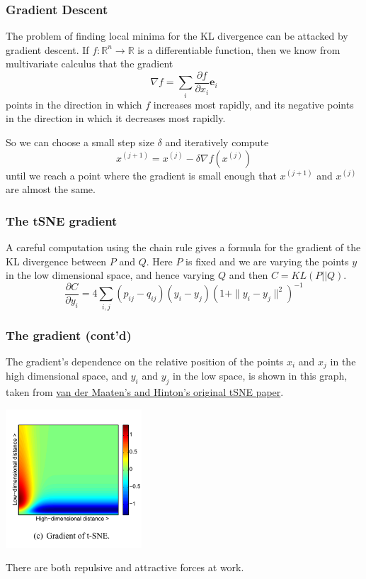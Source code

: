 \documentclass{beamer}
\begin{document}
\begin{frame}
  \frametitle{Gradient Descent}
  The problem of finding local minima for the KL divergence can be attacked by gradient descent. If $f:\mathbb{R}^{n}\to\mathbb{R}$
  is a differentiable function, then we know from multivariate calculus that the gradient
  $$
  \nabla f = \sum_{i}\frac{\partial f}{\partial x_i}\mathbf{e}_{i}
  $$
  points in the direction in which $f$ increases most rapidly, and its negative points in the direction in which it decreases most rapidly.
  \bigskip\noindent

  So we can choose a small step size $\delta$ and iteratively compute
  $$
  x^{(j+1)}=x^{(j)}-\delta\nabla f(x^{(j)})
  $$
  until we reach a point where the gradient is small enough that $x^{(j+1)}$  and $x^{(j)}$ are almost the same.
\end{frame}
\begin{frame}
  \frametitle{The tSNE gradient}
  A careful computation using the chain rule gives a formula for the gradient of the KL divergence between $P$ and $Q$. Here $P$ is fixed and we are varying
  the points $y$ in the low dimensional space, and hence varying $Q$ and then $C=KL(P||Q)$.
  $$
  \frac{\partial C}{\partial y_i} =
  4\sum_{i,j} (p_{ij}-q_{ij}) (y_i-y_j) (1+\|y_i-y_j\|^2)^{-1}
  $$
\end{frame}
\begin{frame}
\frametitle{The gradient (cont'd)}

  The gradient's dependence on the relative position of the points $x_i$ and $x_j$ in the high dimensional space, and $y_i$ and $y_j$ in the low space,
  is shown in this graph, taken from \href{https://lvdmaaten.github.io/publications/papers/JMLR\_2008.pdf}{van der Maaten's and Hinton's original tSNE paper}.
\begin{center}
  \includegraphics[width=2in]{tsneGradient.png}

There are both repulsive and attractive forces at work.
\end{center}
\end{frame}
\end{document}
